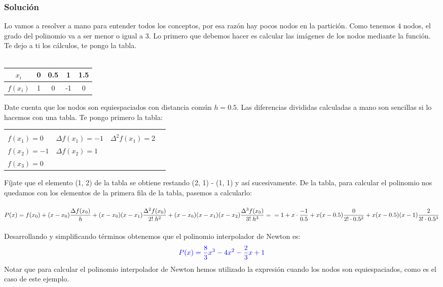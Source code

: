 \documentclass[12pt,a4paper,oneside]{scrbook}
\begin{document}
\subsubsection*{Solución}
Lo vamos a resolver a mano para entender todos los conceptos, por esa razón hay pocos nodos en la partición. Como tenemos $4$ nodos, el grado del polinomio va a ser menor o igual a 3. Lo primero que debemos hacer es calcular las imágenes de los nodos mediante la función. Te dejo a ti los cálculos, te pongo la tabla.\\ \\
\begin{center}
    \begin{tabular}{|c||c|c|c|c|}
        \hline
        $x_i$ & 0 & 0.5 & 1 & 1.5 \\ \hline
        $f(x_i)$ & 1 & 0 & -1 & 0 \\ \hline
    \end{tabular}
\end{center}
Date cuenta que los nodos son equiespaciados con distancia común $h=0.5$. Las diferencias divididas calculadas a mano son sencillas si lo hacemos con una tabla. Te pongo primero la tabla:
\begin{center}
    \begin{tabular}{|llll|}
        \hline
        \color{blue}{$f(x_0)=1$} & \color{blue}{$\Delta f(x_0)=-1$} & \color{blue}{$\Delta^2 f(x_0)=0$} & \color{blue}{$\Delta^3 f(x_0)=2$} \\
        $f(x_1)=0$ & $\Delta f(x_1)=-1$ & $\Delta^2 f(x_1)=2$ & \\
        $f(x_2)=-1$ & $\Delta f(x_2)=1$ & & \\ 
        $f(x_3)=0$ & & & \\ \hline
    \end{tabular}
\end{center}\newpage
Fíjate que el elemento (1, 2) de la tabla se obtiene restando (2, 1) - (1, 1) y así sucesivamente. De la tabla, para calcular el polinomio nos quedamos con los elementos de la primera fila de la tabla, pasemos a calcularlo:\\ \\
$
P(x)=f(x_0)+(x-x_0)\dfrac{\Delta f(x_0)}{h}+(x-x_0)(x-x_1)\dfrac{\Delta^2 f(x_0)}{2!\;h^2}+(x-x_0)(x-x_1)(x-x_2)\dfrac{\Delta^3 f(x_0)}{3!\;h^3}=\\ \\=1+x\cdot \dfrac{-1}{0.5}+x(x-0.5)\dfrac{0}{2!\cdot 0.5^2}+x(x-0.5)(x-1)\dfrac{2}{3!\cdot 0.5^3}
$\\ \\
Desarrollando y simplificando términos obtenemos que el polinomio interpolador de Newton es:
$$
\color{blue}{P(x)=\frac{8}{3}x^3-4x^2-\frac{2}{3}x+1}
$$
Notar que para calcular el polinomio interpolador de Newton hemos utilizado la expresión cuando los nodos son equiespaciados, como es el caso de este ejemplo.
\end{document}
